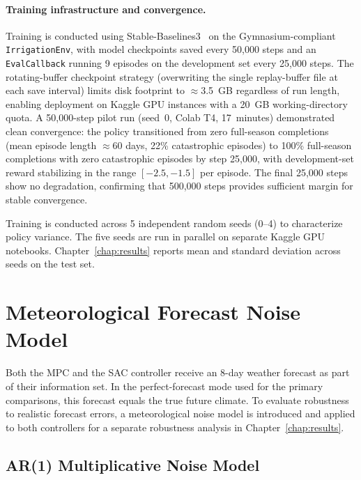 \paragraph{Training infrastructure and convergence.}
Training is conducted using Stable-Baselines3~\cite{raffin2021sb3} on the
Gymnasium-compliant \texttt{IrrigationEnv}, with model checkpoints saved
every 50{,}000 steps and an \texttt{EvalCallback} running 9 episodes on the
development set every 25{,}000 steps. The rotating-buffer checkpoint strategy
(overwriting the single replay-buffer file at each save interval) limits disk
footprint to $\approx$3.5~GB regardless of run length, enabling deployment
on Kaggle GPU instances with a 20~GB working-directory quota. A 50{,}000-step
pilot run (seed~0, Colab T4, 17~minutes) demonstrated clean convergence: the
policy transitioned from zero full-season completions (mean episode length
$\approx$60 days, 22\% catastrophic episodes) to 100\% full-season
completions with zero catastrophic episodes by step 25{,}000, with
development-set reward stabilizing in the range $[-2.5, -1.5]$ per episode.
The final 25{,}000 steps show no degradation, confirming that 500{,}000 steps
provides sufficient margin for stable convergence.

Training is conducted across 5 independent random seeds (0--4) to
characterize policy variance. The five seeds are run in parallel on separate
Kaggle GPU notebooks. Chapter~\ref{chap:results} reports mean and standard
deviation across seeds on the test set.

\section{Meteorological Forecast Noise Model}
\label{sec:ctrl-forecast-noise}

Both the MPC and the SAC controller receive an 8-day weather forecast as
part of their information set. In the perfect-forecast mode used for the
primary comparisons, this forecast equals the true future climate. To
evaluate robustness to realistic forecast errors, a meteorological noise
model is introduced and applied to both controllers for a separate
robustness analysis in Chapter~\ref{chap:results}.

\subsection{AR(1) Multiplicative Noise Model}
\label{ssec:ctrl-noise-model}

